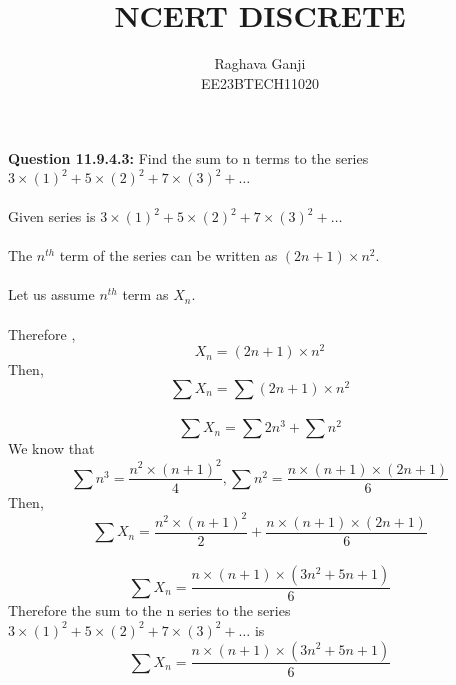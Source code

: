 \documentclass[joournal,12pt,twocolumn]{IEEEtran}
\title{NCERT DISCRETE}
\author{Raghava Ganji\\EE23BTECH11020}
\date{}
\begin{document}
\maketitle
\newpage
\bigskip
\textbf{Question 11.9.4.3:}
Find the sum to n terms to the series $3\times(1)^2+5\times(2)^2+7\times(3)^2+ \ldots$\\
\sollution\\
Given series is $3\times(1)^2+5\times(2)^2+7\times(3)^2+ \ldots$\\\\
The $n^{th}$ term of the series can be written as $(2n+1)\times n^2$.\\\\
Let us assume $n^{th}$ term as $X_n$.\\\\
Therefore ,
\begin{equation}
X_n=(2n+1)\times n^2
\end{equation}
Then,
\begin{equation}
\sum X_n=\sum (2n+1)\times n^2
\end{equation}\\
\begin{equation}
\sum X_n=\sum 2n^3 +\sum n^2
\end{equation}
We know that 
\begin{equation}
\sum n^3=\frac{n^2\times(n+1)^2}{4}, \sum n^2=\frac{n\times(n+1)\times(2n+1)}{6}
\end{equation}
Then,
\begin{equation}
\sum X_n=\frac{n^2\times(n+1)^2}{2} +\frac{n\times(n+1)\times(2n+1)}{6}
\end{equation}\\
\begin{equation}
\sum X_n=\frac{n\times(n+1)\times(3n^2+5n+1)}{6}
\end{equation} 
Therefore the sum to the n series to the series $3\times(1)^2+5\times(2)^2+7\times(3)^2+\ldots$ is 
\begin{equation}
\sum X_n=\frac{n\times(n+1)\times(3n^2+5n+1)}{6}
\end{equation}
\end{document}
